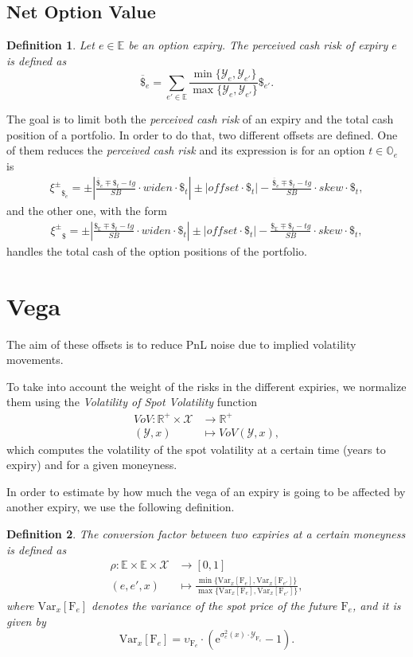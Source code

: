 \documentclass[10pt, a4paper, oneside]{article}
\newcommand{\R}{\ensuremath{\mathbb{R}}}
\def\rme{\mathrm{e}}
\newtheorem*{definition}{Definition}
\newcommand{\Var}{\ensuremath{\mathrm{Var}}}
\newcommand{\function}[5]{\begin{split} #1\colon #2 &\to #3 \\ #4 &\mapsto #5\end{split}}
\newcommand{\expiries}{\ensuremath{\mathbb{E}}}
\newcommand{\options}{\ensuremath{\mathbb{O}}}
\newcommand{\future}{\ensuremath{\mathrm{F}}}
\newcommand{\moneynessset}{\ensuremath{\mathcal{X}}}
\newcommand{\volatility}{\ensuremath{\sigma}}
\newcommand{\price}{\ensuremath{\upsilon}}
\newcommand{\yte}{\ensuremath{\mathcal{Y}}}
\newcommand{\cash}{\ensuremath{\mathdollar}}
\newcommand{\pcash}{\ensuremath{\overline{\cash}}}
\newcommand{\offsetbs}{\ensuremath{\xi^{\pm}}}
\newcommand{\VoV}{\ensuremath{\mathit{Vo\!V}}}
\newcommand{\target}{\ensuremath{\mathit{tg}}}
\newcommand{\widen}{\ensuremath{\mathit{widen}}}
\newcommand{\skw}{\ensuremath{\mathit{skew}}}
\newcommand{\offset}{\ensuremath{\mathit{offset}}}
\newcommand{\skewunits}[3]{\ensuremath{\frac{{#1}\mp{#2}-\target}{{#3}}}}
\newcommand{\offsetformulacomma}[4]{{\begin{align*}\offsetbs_{#4}=\pm\left|\skewunits{#1}{#2}{#3}\cdot\widen\cdot{#2}\right| \pm \left|\offset\cdot{#2}\right| - \skewunits{#1}{#2}{#3}\cdot\skw\cdot{#2},\end{align*}}}
\begin{document}
\subsection{Net Option Value}

\begin{definition}
  Let $e \in \expiries$ be an option expiry. The \emph{perceived cash risk} of expiry $e$ is defined as
  \[ \pcash_{e}=\sum_{e' \in \expiries}\frac{\min\{\yte_e, \yte_{e'}\}}{\max\{\yte_e, \yte_{e'}\}}\cash_{e'}.\]
\end{definition}

\noindent The goal is to limit both the \emph{perceived cash risk} of an expiry and the total cash position of a portfolio. In order to do that, two different offsets are defined. One of them reduces the \emph{perceived cash risk} and its expression is for an
option $t \in \options_e$ is
\offsetformulacomma{\pcash_e}{\cash_t}{SB}{\cash_e}
and the other one, with the form
\offsetformulacomma{\cash_\expiries}{\cash_t}{SB}{\cash}
handles the total cash of the option positions of the portfolio.










\section{Vega}

\noindent The aim of these offsets is to reduce PnL noise due to implied volatility movements.

\noindent To take into account the weight of the risks in the different expiries, we normalize them using the \emph{Volatility of Spot Volatility} function
\[ \function{\VoV}{\R^+\!\times\moneynessset}{\R^+}{(\yte, x)}{\VoV(\yte, x),} \]
which computes the volatility of the spot volatility at a certain time (years to expiry) and for a given moneyness.

\noindent In order to estimate by how much the vega of an expiry is going to be affected by another expiry, we use the following definition.

\begin{definition} The \emph{conversion factor} between two expiries at a certain moneyness is defined as
 \[ \function{\rho}{\expiries\times\expiries\times\moneynessset}{[0, 1]}{(e, e', x)}{\frac{\min\{\Var_x[\future_e], \Var_x[\future_{e'}]\}}{\max\{\Var_x[\future_e], \Var_x[\future_{e'}]\}},} \]
 where $\Var_x[\future_e]$ denotes the variance of the spot price of the future $\future_e$, and it is given by
 \[ \Var_x[\future_e] = \price_{\future_e}\cdot(\rme^{\volatility^2_e(x)\cdot\yte_{\future_e}}-1). \]
\end{definition}
\end{document}
